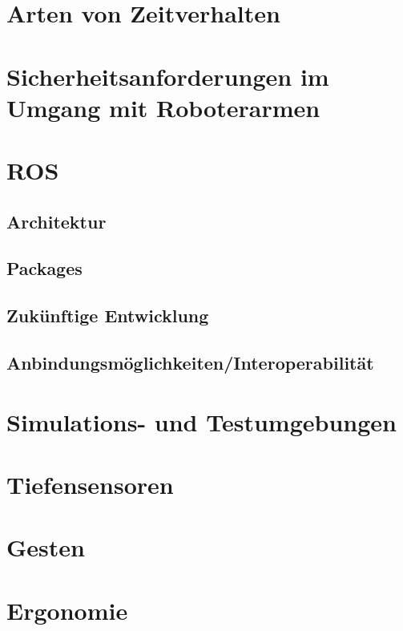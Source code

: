 \section{Arten von Zeitverhalten}


\section{Sicherheitsanforderungen im Umgang mit Roboterarmen}


\section{ROS}


\subsection{Architektur}


\subsection{Packages}


\subsection{Zukünftige Entwicklung}


\subsection{Anbindungsmöglichkeiten/Interoperabilität}


\section{Simulations- und Testumgebungen}


\section{Tiefensensoren}


\section{Gesten}


\section{Ergonomie}
